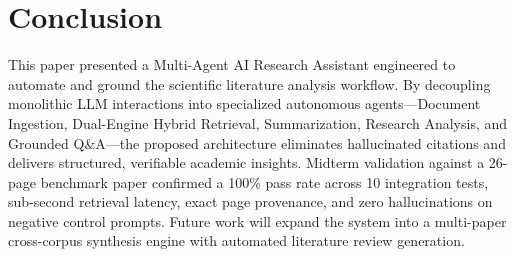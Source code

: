 \documentclass[conference]{IEEEtran}
\begin{document}
\section{Conclusion}
This paper presented a Multi-Agent AI Research Assistant engineered to automate and ground the scientific literature analysis workflow. By decoupling monolithic LLM interactions into specialized autonomous agents---Document Ingestion, Dual-Engine Hybrid Retrieval, Summarization, Research Analysis, and Grounded Q\&A---the proposed architecture eliminates hallucinated citations and delivers structured, verifiable academic insights. Midterm validation against a 26-page benchmark paper confirmed a 100\% pass rate across 10 integration tests, sub-second retrieval latency, exact page provenance, and zero hallucinations on negative control prompts. Future work will expand the system into a multi-paper cross-corpus synthesis engine with automated literature review generation.
\end{document}

